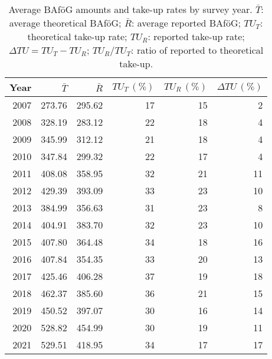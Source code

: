 \begin{table}[htbp]
\centering
\begin{tabular}{rrrrrr}
\toprule
\textbf{Year} & \(\bar{T}\) & \(\bar{R}\) & \(TU_T\,(\%)\) & \(TU_R\,(\%)\) & \(\Delta TU\,(\%)\) \\
\midrule
2007 & 273.76 & 295.62 & 17 & 15 & 2 \\
2008 & 328.19 & 283.12 & 22 & 18 & 4 \\
2009 & 345.99 & 312.12 & 21 & 18 & 4 \\
2010 & 347.84 & 299.32 & 22 & 17 & 4 \\
2011 & 408.08 & 358.95 & 32 & 21 & 11 \\
2012 & 429.39 & 393.09 & 33 & 23 & 10 \\
2013 & 384.99 & 356.63 & 31 & 23 & 8 \\
2014 & 404.91 & 383.70 & 32 & 23 & 10 \\
2015 & 407.80 & 364.48 & 34 & 18 & 16 \\
2016 & 407.84 & 354.35 & 33 & 20 & 13 \\
2017 & 425.46 & 406.28 & 37 & 19 & 18 \\
2018 & 462.37 & 385.60 & 36 & 21 & 15 \\
2019 & 450.52 & 397.07 & 30 & 16 & 14 \\
2020 & 528.82 & 454.99 & 30 & 19 & 11 \\
2021 & 529.51 & 418.95 & 34 & 17 & 17 \\
\bottomrule
\end{tabular}
\caption{Average BAföG amounts and take-up rates by survey year. 
\(\bar{T}\): average theoretical BAföG; 
\(\bar{R}\): average reported BAföG; 
\(TU_T\): theoretical take-up rate; 
\(TU_R\): reported take-up rate; 
\(\Delta TU = TU_T - TU_R\); 
\(TU_R / TU_T\): ratio of reported to theoretical take-up.}
\end{table}



